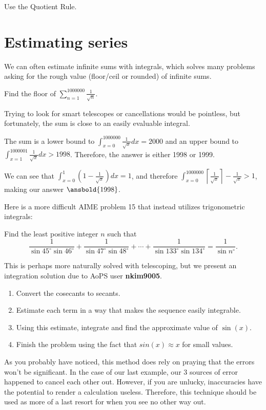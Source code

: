 \documentclass[mast]{lucky}
\begin{document}
\begin{pro}
Use the Quotient Rule.
\end{pro}
\section{Estimating series}
We can often estimate infinite sums with integrals, which solves many problems asking for the rough value (floor/ceil or rounded) of infinite sums.
\begin{exam}
Find the floor of $\sum_{n=1}^{1000000}\frac{1}{\sqrt{n}}$.
\end{exam}
\begin{sol}
Trying to look for smart telescopes or cancellations would be pointless, but fortunately, the sum is close to an easily evaluable integral.

The sum is a lower bound to $\int_{x=0}^{1000000}\frac{1}{\sqrt{x}}dx=2000$ and an upper bound to $\int_{x=1}^{1000001}\frac{1}{\sqrt{x}}dx>1998$. Therefore, the answer is either 1998 or 1999. 

We can see that $\int_{x=0}^{1}(1-\frac{1}{\sqrt{x}})dx=1$, and therefore $\int_{x=0}^{1000000}\left\lceil\frac{1}{\sqrt{x}}\right\rceil-\frac{1}{\sqrt{x}}>1$, making our answer $\ansbold{1998}$.
\end{sol}
Here is a more difficult AIME problem 15 that instead utilizes trigonometric integrals:
\begin{exam}[AIME II 2000/15]
Find the least positive integer $n$ such that\[ \frac 1{\sin 45^\circ\sin 46^\circ}+\frac 1{\sin 47^\circ\sin 48^\circ}+\cdots+\frac 1{\sin 133^\circ\sin 134^\circ}=\frac 1{\sin n^\circ}. \]
\end{exam}
\begin{walk}
This is perhaps more naturally solved with telescoping, but we present an integration solution due to AoPS user \textbf{nkim9005}.
\begin{enumerate}
    \item Convert the cosecants to secants.
    \item Estimate each term in a way that makes the sequence easily integrable.
    \item Using this estimate, integrate and find the approximate value of $\sin(x)$.
    \item Finish the problem using the fact that $sin(x)\approx x$ for small values.
\end{enumerate}
\end{walk}
As you probably have noticed, this method does rely on praying that the errors won't be significant.
In the case of our last example, our 3 sources of error happened to cancel each other out.
However, if you are unlucky, inaccuracies have the potential to render a calculation useless.
Therefore, this technique should be used as more of a last resort for when you see no other way out.
\end{document}
